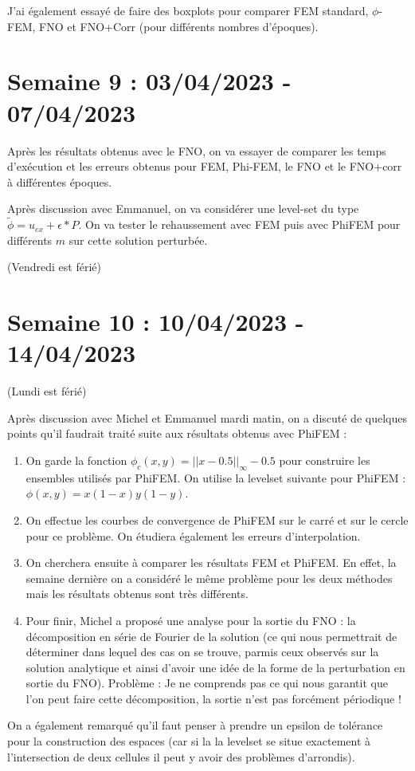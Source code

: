 \documentclass[french]{article}
\begin{document}
	J'ai également essayé de faire des boxplots pour comparer FEM standard, $\phi$-FEM, FNO et FNO+Corr (pour différents nombres d'époques).
\section{Semaine 9 : 03/04/2023 - 07/04/2023}
	Après les résultats obtenus avec le FNO, on va essayer de comparer les temps d'exécution et les erreurs obtenus pour FEM, Phi-FEM, le FNO et le FNO+corr à différentes époques.
	
	Après discussion avec Emmanuel, on va considérer une level-set du type $\tilde{\phi}=u_{ex}+\epsilon*P$. On va tester le rehaussement avec FEM puis avec PhiFEM pour différents $m$ sur cette solution perturbée.
	
	(Vendredi est férié)
\section{Semaine 10 : 10/04/2023 - 14/04/2023}
	(Lundi est férié)
	
	Après discussion avec Michel et Emmanuel mardi matin, on a discuté de quelques points qu'il faudrait traité suite aux résultats obtenus avec PhiFEM :
	\begin{enumerate}[label=\textbullet]
		\item On garde la fonction $\phi_c(x,y)=||x-0.5||_\infty-0.5$ pour construire les ensembles utilisés par PhiFEM. On utilise la levelset suivante pour PhiFEM : $\phi(x,y)=x(1-x)y(1-y)$.
		\item On effectue les courbes de convergence de PhiFEM sur le carré et sur le cercle pour ce problème. On étudiera également les erreurs d'interpolation.
		\item On cherchera ensuite à comparer les résultats FEM et PhiFEM. En effet, la semaine dernière on a considéré le même problème pour les deux méthodes mais les résultats obtenus sont très différents.
		\item Pour finir, Michel a proposé une analyse pour la sortie du FNO : la décomposition en série de Fourier de la solution (ce qui nous permettrait de déterminer dans lequel des cas on se trouve, parmis ceux observés sur la solution analytique et ainsi d'avoir une idée de la forme de la perturbation en sortie du FNO). Problème : Je ne comprends pas ce qui nous garantit que l'on peut faire cette décomposition, la sortie n'est pas forcément périodique !
	\end{enumerate}
	On a également remarqué qu'il faut penser à prendre un epsilon de tolérance pour la construction des espaces (car si la la levelset se situe exactement à l'intersection de deux cellules il peut y avoir des problèmes d'arrondis).
\end{document}
